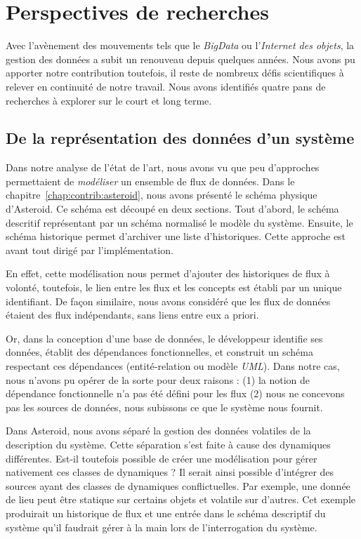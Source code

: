 \section{Perspectives de recherches}\label{sec:conclusion:perspectives}
Avec l'avènement des mouvements tels que le \textit{BigData} ou l'\textit{Internet des objets}, la gestion des données a subit un renouveau depuis quelques années. Nous avons pu apporter notre contribution toutefois, il reste de nombreux défis scientifiques à relever en continuité de notre travail. Nous avons identifiés quatre pans de recherches à explorer sur le court et long terme.

\subsection{De la représentation des données d'un système}
Dans notre analyse de l'état de l'art, nous avons vu que peu d'approches permettaient de \textit{modéliser} un ensemble de flux de données. Dans le chapitre~\ref{chap:contrib:asteroid}, nous avons présenté le schéma physique d'Asteroid. Ce schéma est découpé en deux sections. Tout d'abord, le schéma descritif représentant par un schéma normalisé le modèle du système. Ensuite, le schéma historique permet d'archiver une liste d'historiques. Cette approche est avant tout dirigé par l'implémentation.

En effet, cette modélisation nous permet d'ajouter des historiques de flux à volonté, toutefois, le lien entre les flux et les concepts est établi par un unique identifiant. De façon similaire, nous avons considéré que les flux de données étaient des flux indépendants, sans liens entre eux a priori.

Or, dans la conception d'une base de données, le développeur identifie ses données, établit des dépendances fonctionnelles, et construit un schéma respectant ces dépendances (entité-relation ou modèle \textit{UML}). Dans notre cas, nous n'avons pu opérer de la sorte pour deux raisons : (1) la notion de dépendance fonctionnelle n'a pas été défini pour les flux (2) nous ne concevons pas les sources de données, nous subissons ce que le système nous fournit.

Dans Asteroid, nous avons séparé la gestion des données volatiles de la description du système. Cette séparation s'est faite à cause des dynamiques différentes. Est-il toutefois possible de créer une modélisation pour gérer nativement ces classes de dynamiques ? Il serait ainsi possible d'intégrer des sources ayant des classes de dynamiques conflictuelles. Par exemple, une donnée de lieu peut être statique sur certains objets et volatile sur d'autres. Cet exemple produirait un historique de flux et une entrée dans le schéma descriptif du système qu'il faudrait gérer à la main lors de l'interrogation du système.

